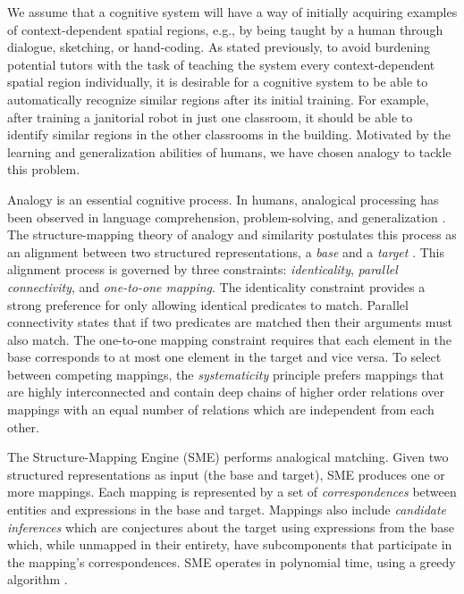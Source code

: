 \documentclass[letterpaper]{article}
\begin{document}

We assume that a cognitive system will have a way of initially acquiring examples of context-dependent spatial regions, e.g., by being taught by a human through dialogue, sketching, or hand-coding. As stated previously, to avoid burdening potential tutors with the task of teaching the system every context-dependent spatial region individually, it is desirable for a cognitive system to be able to automatically recognize similar regions after its initial training. For example, after training a janitorial robot in just one classroom, it should be able to identify similar regions in the other classrooms in the building. Motivated by the learning and generalization abilities of humans, we have chosen analogy to tackle this problem.

Analogy is an essential cognitive process. In humans, analogical processing has been observed in language comprehension, problem-solving, and generalization \cite{Gentner2003}. The structure-mapping theory of analogy and similarity postulates this process as an alignment between two structured representations, a \textit{base} and a \textit{target} \cite{Gentner1983a}. This alignment process is governed by three constraints: \textit{identicality}, \textit{parallel connectivity}, and \textit{one-to-one mapping}. The identicality constraint provides a strong preference for only allowing identical predicates to match. Parallel connectivity states that if two predicates are matched then their arguments must also match. The one-to-one mapping constraint requires that each element in the base corresponds to at most one element in the target and vice versa. To select between competing mappings, the \textit{systematicity} principle prefers mappings that are highly interconnected and contain deep chains of higher order relations over mappings with an equal number of relations which are independent from each other.

The Structure-Mapping Engine (SME) \cite{Falkenhainer1989a} performs analogical matching. Given two structured representations as input (the base and target), SME produces one or more mappings. Each mapping is represented by a set of \textit{correspondences} between entities and expressions in the base and target.  Mappings also include \textit{candidate inferences} which are conjectures about the target using expressions from the base which, while unmapped in their entirety, have subcomponents that participate in the mapping's correspondences. SME operates in polynomial time, using a greedy algorithm \cite{Forbus/etal1994}.
\end{document}
